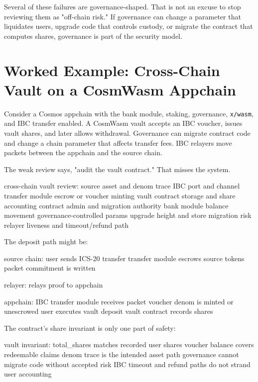 Several of these failures are governance-shaped. That is not an excuse to stop reviewing them as "off-chain risk." If governance can change a parameter that liquidates users, upgrade code that controls custody, or migrate the contract that computes shares, governance is part of the security model.

\section{Worked Example: Cross-Chain Vault on a CosmWasm Appchain}

Consider a Cosmos appchain with the bank module, staking, governance, \texttt{x/wasm}, and IBC transfer enabled. A CosmWasm vault accepts an IBC voucher, issues vault shares, and later allows withdrawal. Governance can migrate contract code and change a chain parameter that affects transfer fees. IBC relayers move packets between the appchain and the source chain.

The weak review says, "audit the vault contract." That misses the system.

\begin{codeblock}
cross-chain vault review:
    source asset and denom trace
    IBC port and channel
    transfer module escrow or voucher minting
    vault contract storage and share accounting
    contract admin and migration authority
    bank module balance movement
    governance-controlled params
    upgrade height and store migration risk
    relayer liveness and timeout/refund path
\end{codeblock}

The deposit path might be:

\begin{codeblock}
source chain:
    user sends ICS-20 transfer
    transfer module escrows source tokens
    packet commitment is written

relayer:
    relays proof to appchain

appchain:
    IBC transfer module receives packet
    voucher denom is minted or unescrowed
    user executes vault deposit
    vault contract records shares
\end{codeblock}

The contract's share invariant is only one part of safety:

\begin{codeblock}
vault invariant:
    total_shares matches recorded user shares
    voucher balance covers redeemable claims
    denom trace is the intended asset path
    governance cannot migrate code without accepted risk
    IBC timeout and refund paths do not strand user accounting
\end{codeblock}

